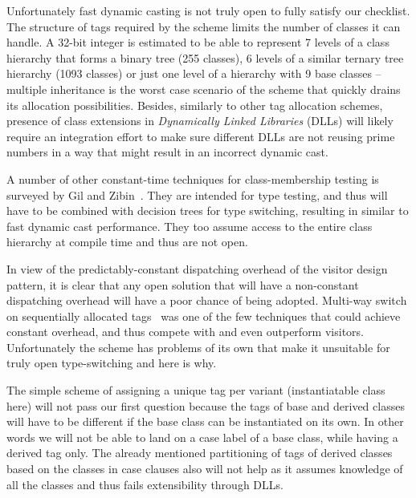 Unfortunately fast dynamic casting is not truly open to fully satisfy our 
checklist. The structure of tags required by the scheme limits the number of 
classes it can handle. A 32-bit integer is estimated to be able to represent 7 
levels of a class hierarchy that forms a binary tree (255 classes), 6 levels of 
a similar ternary tree hierarchy (1093 classes) or just one level of a hierarchy 
with 9 base classes -- multiple inheritance is the worst case scenario of the 
scheme that quickly drains its allocation possibilities. Besides, similarly to 
other tag allocation schemes, presence of class extensions in \emph{Dynamically Linked Libraries} (DLLs) will likely 
require an integration effort to make sure different DLLs are not reusing prime 
numbers in a way that might result in an incorrect dynamic cast.

A number of other constant-time techniques for class-membership testing is 
surveyed by Gil and Zibin~\cite[]{PQEncoding}. They are intended 
for type testing, and thus will have to be combined with decision trees 
for type switching, resulting in similar to fast dynamic cast performance. 
They too assume access to the entire class hierarchy at compile time and thus 
are not open.

In view of the predictably-constant dispatching overhead of the visitor design pattern, 
it is clear that any open solution that will have a non-constant dispatching 
overhead will have a poor chance of being adopted. Multi-way switch on 
sequentially allocated tags~\cite{Spuler94} was one of the few techniques that 
could achieve constant overhead, and thus compete with and even outperform visitors. 
Unfortunately the scheme has problems of its own that make it unsuitable for 
truly open type-switching and here is why.



The simple scheme of assigning a unique tag per variant (instantiatable class 
here) will not pass our first question because the tags of base and derived 
classes will have to be different if the base class can be instantiated on its 
own. In other words we will not be able to land on a case label of a base class, while 
having a derived tag only. The already mentioned partitioning of tags of derived 
classes based on the classes in case clauses also will not help as it assumes 
knowledge of all the classes and thus fails extensibility through DLLs.

